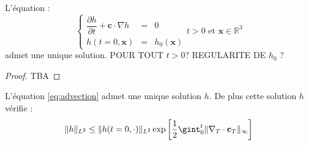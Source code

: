\begin{proposition}
L'équation :
\begin{equation}
\left\lbrace
\begin{array}{rcl}
\dfrac{\partial h}{\partial t} + \mathbf{c} \cdot \nabla h & = & 0 \\
h(t=0,\mathbf{x}) & = & h_0(\mathbf{x})
\end{array}
\right. t>0 \text{ et } \mathbf{x} \in \mathbb{R}^3
\end{equation}
admet une unique solution.
POUR TOUT $t>0$? REGULARITE DE $h_0$ ?
\label{prop:existence et unicité advection R^3}
\end{proposition}

\begin{proof}
TBA
\end{proof}

\begin{proposition}
L'équation \eqref{eq:advection} admet une unique solution $h$. De plus cette solution $h$ vérifie :
\begin{equation}
\|h\|_{L^2} \leq \|h(t=0,\cdot) \|_{L^2} \exp \left[ \dfrac{1}{2} \gint_0^t \| \nabla_T \cdot \mathbf{c}_T \|_{\infty}  \right]
\end{equation}
\end{proposition}

